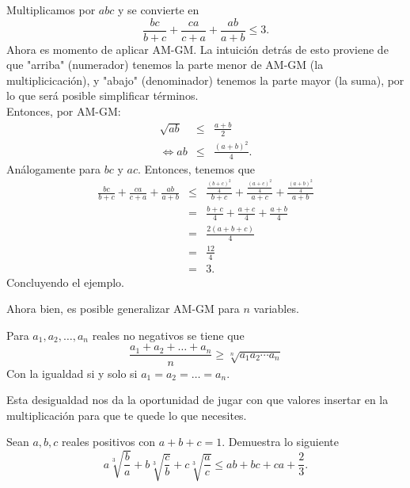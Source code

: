 \documentclass[11pt]{scrartcl}
\begin{document}
\begin{soln}
Multiplicamos por $abc$ y se convierte en 
$$\frac{bc}{b+c}+\frac{ca}{c+a}+\frac{ab}{a+b} \leq 3.$$
Ahora es momento de aplicar AM-GM. La intuici\'on detr\'as de esto proviene de que "arriba" (numerador) tenemos la parte menor de AM-GM (la multiplicicaci\'on), y "abajo" (denominador) tenemos la parte mayor (la suma), por lo que ser\'a posible simplificar t\'erminos.\\

\noindent
Entonces, por AM-GM:
\begin{eqnarray*}
\sqrt{ab} &\leq& \frac{a+b}{2} \\
\Leftrightarrow ab &\leq& \frac{(a+b)^2}{4}.
\end{eqnarray*}
An\'alogamente para $bc$ y $ac$. Entonces, tenemos que 
\begin{eqnarray*}
\frac{bc}{b+c}+\frac{ca}{c+a}+\frac{ab}{a+b} &\leq& \frac{\frac{(b+c)^2}{4}}{b+c}+\frac{\frac{(a+c)^2}{4}}{a+c}+\frac{\frac{(a+b)^2}{4}}{a+b} \\
&=& \frac{b+c}{4}+\frac{a+c}{4}+\frac{a+b}{4} \\
&=& \frac{2(a+b+c)}{4} \\
&=& \frac{12}{4} \\
&=& 3.
\end{eqnarray*}
Concluyendo el ejemplo.
\end{soln}
\noindent
Ahora bien, es posible generalizar AM-GM para $n$ variables. 
\begin{theorem} [AM-GM]
Para $a_1,a_2, \ldots, a_n$ reales no negativos se tiene que 
$$\frac{a_1+a_2+\ldots+a_n}{n} \geq \sqrt[n]{a_1a_2\cdots a_n}$$
Con la igualdad si y solo si $a_1=a_2=\ldots=a_n$.
\end{theorem}

\noindent
Esta desigualdad nos da la oportunidad de jugar con que valores insertar en la multiplicaci\'on para que te quede lo que necesites.

\begin{example}
    \label{JBMOSL22-A3}
    Sean $a,b,c$ reales positivos con $a+b+c=1$. Demuestra lo siguiente
    \[a \sqrt[3]{\frac{b}{a}} + b \sqrt[3]{\frac{c}{b}} + c \sqrt[3]{\frac{a}{c}} \le ab + bc + ca + \frac{2}{3}.\]
\end{example}
\end{document}
